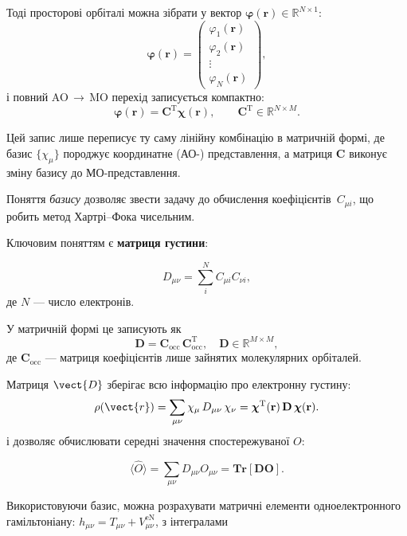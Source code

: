 Тоді просторові орбіталі можна зібрати у вектор
$\boldsymbol{\varphi}(\mathbf r)\in\mathbb R^{N\times 1}$:
\[
	\boldsymbol{\varphi}(\mathbf r)=
	\begin{pmatrix}
		\varphi_1(\mathbf r) \\
		\varphi_2(\mathbf r) \\
		\vdots               \\
		\varphi_N(\mathbf r)
	\end{pmatrix},
\]
і повний AO\,$\to$\,MO перехід записується компактно:
\[
	\boldsymbol{\varphi}(\mathbf r)=
	\mathbf C^{\mathrm T}\boldsymbol{\chi}(\mathbf r),
	\qquad
	\mathbf C^{\mathrm T}\in \mathbb R^{N\times M}.
\]

Цей запис лише переписує ту саму лінійну комбінацію в матричній формі, де
базис $\{\chi_\mu\}$ породжує координатне (АО-) представлення, а матриця
$\mathbf C$ виконує зміну базису до МО-представлення.


Поняття \emph{базису} дозволяє звести задачу до обчислення коефіцієнтів~$C_{\mu i}$, що робить метод Хартрі–Фока чисельним.

Ключовим поняттям є \textbf{матриця густини}:

\begin{equation}\label{eq:D}
	D_{\mu\nu} = \sum_{i}^{N} C_{\mu i} C_{\nu i},
\end{equation}
%
де  $N$ --- число електронів.

У матричній формі це записують як
\begin{equation*}
	\mathbf D = \mathbf C_{\text{occ}}\,\mathbf C_{\text{occ}}^{\mathrm T},\quad \mathbf D \in \mathbb{R}^{M \times M},
\end{equation*}
де \(\mathbf C_{\text{occ}}\) --- матриця коефіцієнтів лише зайнятих
молекулярних орбіталей.

Матриця $\vect{D}$ зберігає всю інформацію про електронну густину:
\begin{equation}\label{eq:rhoDchi}
	\rho(\vect{r}) = \sum\limits_{\mu\nu} \chi_\mu\, D_{\mu\nu}\,  \chi_\nu = \boldsymbol{\chi}^{\mathrm T}(\mathbf r)\,
	\mathbf D\,
	\boldsymbol{\chi}(\mathbf r).
\end{equation}
і дозволяє обчислювати середні значення спостережуваної $O$:

\begin{equation}\label{eq:O}
	\langle \hat{O} \rangle = \sum_{\mu\nu} D_{\mu\nu} O_{\mu\nu} = \mathbf{Tr} [\mathbf{D} \mathbf{O}].
\end{equation}

Використовуючи базис, можна розрахувати матричні елементи одноелектронного гамільтоніану: $h_{\mu\nu} = T_{\mu\nu} + V_{\mu\nu}^{\text{eN}}$, з інтегралами

